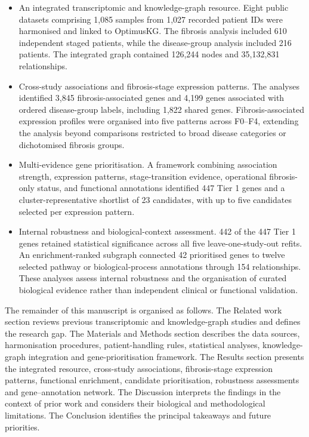 \documentclass[11pt,a4paper]{article}
\begin{document}
\begin{itemize}
    \item An integrated transcriptomic and knowledge-graph resource. Eight public datasets comprising 1,085 samples from 1,027 recorded patient IDs were harmonised and linked to OptimusKG. The fibrosis analysis included 610 independent staged patients, while the disease-group analysis included 216 patients. The integrated graph contained 126,244 nodes and 35,132,831 relationships.

    \item Cross-study associations and fibrosis-stage expression patterns. The analyses identified 3,845 fibrosis-associated genes and 4,199 genes associated with ordered disease-group labels, including 1,822 shared genes. Fibrosis-associated expression profiles were organised into five patterns across F0--F4, extending the analysis beyond comparisons restricted to broad disease categories or dichotomised fibrosis groups.

    \item Multi-evidence gene prioritisation. A framework combining association strength, expression patterns, stage-transition evidence, operational fibrosis-only status, and functional annotations identified 447 Tier 1 genes and a cluster-representative shortlist of 23 candidates, with up to five candidates selected per expression pattern.

    \item Internal robustness and biological-context assessment. 442 of the 447 Tier 1 genes retained statistical significance across all five leave-one-study-out refits. An enrichment-ranked subgraph connected 42 prioritised genes to twelve selected pathway or biological-process annotations through 154 relationships. These analyses assess internal robustness and the organisation of curated biological evidence rather than independent clinical or functional validation.
\end{itemize}

The remainder of this manuscript is organised as follows. The Related work section reviews previous transcriptomic and knowledge-graph studies and defines the research gap. The Materials and Methods section describes the data sources, harmonisation procedures, patient-handling rules, statistical analyses, knowledge-graph integration and gene-prioritisation framework. The Results section presents the integrated resource, cross-study associations, fibrosis-stage expression patterns, functional enrichment, candidate prioritisation, robustness assessments and gene--annotation network. The Discussion interprets the findings in the context of prior work and considers their biological and methodological limitations. The Conclusion identifies the principal takeaways and future priorities.
\end{document}
